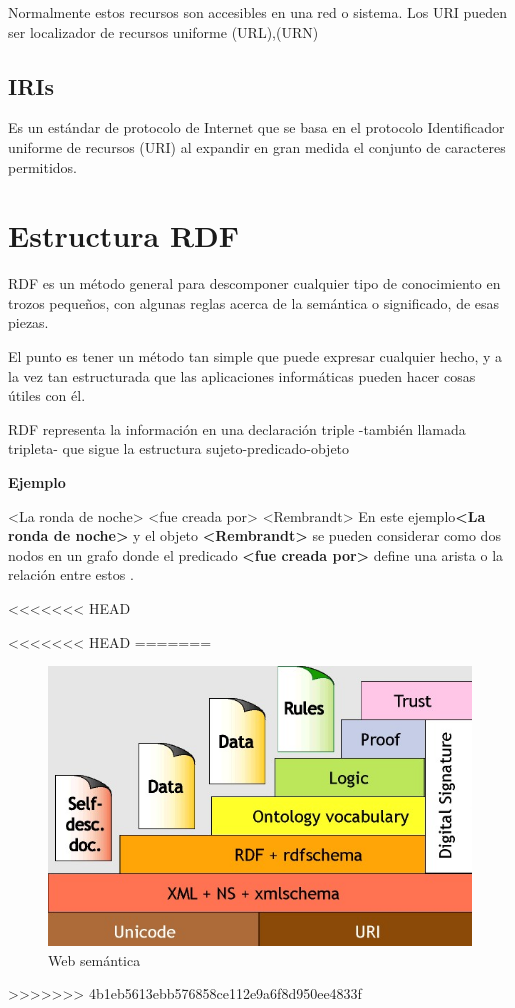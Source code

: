 \documentclass[conference]{IEEEtran}
\begin{document}
Normalmente estos recursos son accesibles en una red o sistema. Los URI pueden ser localizador de recursos uniforme (URL),(URN)
\subsection{IRIs}
Es un estándar de protocolo de Internet que se basa en el protocolo Identificador uniforme de recursos (URI) al expandir en gran medida el conjunto de caracteres permitidos.

\section{Estructura RDF}
RDF es un método general para descomponer cualquier tipo de conocimiento en trozos pequeños, con algunas reglas acerca de la semántica o significado, de esas piezas.

El punto es tener un método tan simple que puede expresar cualquier hecho, y a la vez tan estructurada que las aplicaciones informáticas pueden hacer cosas útiles con él.  \cite{b5}

RDF representa la información en una declaración triple -también llamada tripleta- que sigue la estructura sujeto-predicado-objeto \cite{b5}

\vspace{0.2cm}
\textbf{Ejemplo}

<La ronda de noche> <fue creada por> <Rembrandt>
\vspace{0.2cm}
En este ejemplo\textbf{<La ronda de noche>} y el objeto \textbf{<Rembrandt>} se pueden considerar como dos nodos en un grafo donde el predicado \textbf{<fue creada por>} define una arista o la relación entre estos . \cite{b5}

\vspace{0.2cm}

<<<<<<< HEAD

<<<<<<< HEAD
=======
\begin{figure}[h]
    \centering
	\includegraphics[scale=0.40]{imagenes/imagen1.jpeg} 
	\caption{Web semántica \cite{b7}}
\end{figure}
>>>>>>> 4b1eb5613ebb576858ce112e9a6f8d950ee4833f
\end{document}

